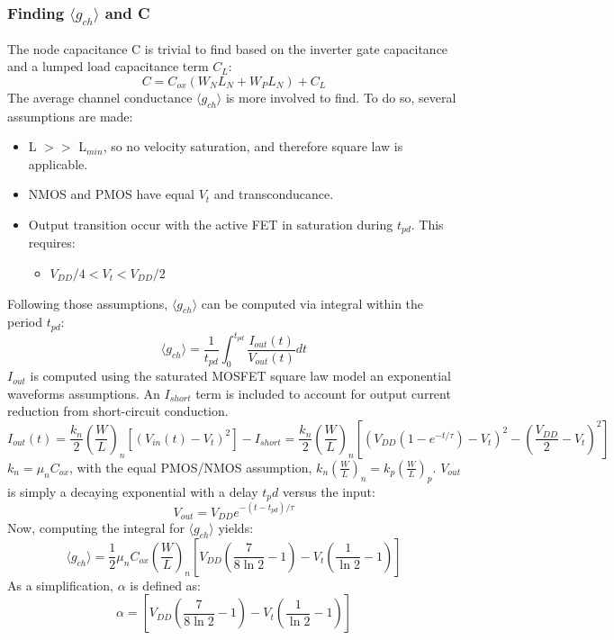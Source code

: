 		\subsubsection{Finding $\langle g_{ch}\rangle$ and C}
			The node capacitance C is trivial to find based on the inverter gate capacitance and a lumped load capacitance term $C_L$:
			\begin{equation}
				C = C_{ox}\left ( W_N L_N + W_P L_N \right) + C_L
			\end{equation}
			The average channel conductance $\langle g_{ch} \rangle$ is more involved to find. To do so, several assumptions are made:
			\begin{itemize}
				\item L $>>$ L$_{min}$, so no velocity saturation, and therefore square law is applicable.
				\item NMOS and PMOS have equal $V_t$ and transconducance.
				\item Output transition occur with the active FET in saturation during $t_{pd}$. This requires:
				\begin{itemize}
					\item $V_{DD}/4 < V_{t} < V_{DD}/2$
				\end{itemize}
			\end{itemize}
			Following those assumptions, $\langle g_{ch} \rangle$ can be computed via integral within the period $t_{pd}$:
			\begin{equation}
				\langle g_{ch} \rangle = \frac{1}{t_{pd}} \int_0^{t_{pd}}\frac{I_{out}(t)}{V_{out}(t)}dt
			\end{equation}
			$I_{out}$ is computed using the saturated MOSFET square law model an exponential waveforms assumptions. An $I_{short}$ term is included to account for output current reduction from short-circuit conduction.
			\begin{equation}
				I_{out}(t) = \frac{k_n}{2}\left(\frac{W}{L}\right)_n\left[\left(V_{in}(t) - V_t\right)^2 \right]  - I_{short} = \frac{k_n}{2}\left(\frac{W}{L}\right)_n\left[\left(V_{DD}\left(1-e^{-t/\tau}\right) - V_t\right)^2 - \left(\frac{V_{DD}}{2} -V_t\right)^2\right]
			\end{equation}
			$k_n = \mu_nC_{ox}$, with the equal PMOS/NMOS assumption, $k_n\left(\frac{W}{L}\right)_n=k_p\left(\frac{W}{L}\right)_p$. $V_{out}$ is simply a decaying exponential with a delay $t_pd$ versus the input:
			\begin{equation}
				V_{out} = V_{DD}e^{-(t-t_{pd})/\tau}
			\end{equation}
			Now, computing the integral for $\langle g_{ch} \rangle$ yields:
			\begin{equation}
				\langle g_{ch} \rangle = \frac{1}{2}\mu_nC_{ox}\left(\frac{W}{L}\right)_n\left[V_{DD}\left(\frac{7}{8\ln2}-1\right)-V_t\left(\frac{1}{\ln2}-1\right) \right]
			\end{equation}
			As a simplification, $\alpha$ is defined as:
			\begin{equation}
				\alpha = \left[V_{DD}\left(\frac{7}{8\ln2}-1\right)-V_t\left(\frac{1}{\ln2}-1\right) \right]
			\end{equation}	
		
